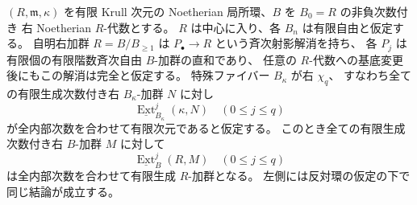 \begin{lemma}
\label{lem:local-chi-specialization}
$(R,\mathfrak m,\kappa)$ を有限 Krull 次元の
Noetherian 局所環、$B$ を $B_0=R$ の非負次数付き
右 Noetherian $R$-代数とする。
$R$ は中心に入り、各 $B_n$ は有限自由と仮定する。
自明右加群 $R=B/B_{\ge1}$ は
$P_\bullet\to R$ という斉次射影解消を持ち、
各 $P_j$ は有限個の有限階数斉次自由 $B$-加群の直和であり、
任意の $R$-代数への基底変更後にもこの解消は完全と仮定する。
特殊ファイバー $B_\kappa$ が右 $\chi_q$、
すなわち全ての有限生成次数付き右 $B_\kappa$-加群 $N$ に対し
\[
 \underline{\operatorname{Ext}}_{B_\kappa}^{j}(\kappa,N)
 \quad(0\le j\le q)
\]
が全内部次数を合わせて有限次元であると仮定する。
このとき全ての有限生成次数付き右 $B$-加群 $M$ に対して
\[
 \underline{\operatorname{Ext}}_B^j(R,M)
 \quad(0\le j\le q)
\]
は全内部次数を合わせて有限生成 $R$-加群となる。
左側には反対環の仮定の下で同じ結論が成立する。
\end{lemma}
